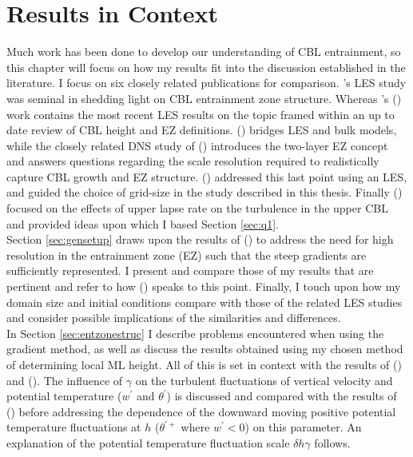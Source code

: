 
\chapter{Results in Context}
\label{ch:disc}
\setlength{\parindent}{0cm}

Much work has been done to develop our understanding of \acs{CBL} entrainment, so this chapter will focus on how my results fit into the discussion established in the literature.  I focus on six closely related publications for comparison.  \citeauthor{SullMoengStev}'s \citeyear{SullMoengStev} \acs{LES} study was seminal in shedding light on \acs{CBL} entrainment zone structure.  Whereas \citeauthor{BrooksFowler2}'s (\citeyear{BrooksFowler2}) work contains the most recent \acs{LES} results on the topic framed within an up to date review of \acs{CBL} height and \acs{EZ} definitions.  \citeauthor{FedConzMir04} (\citeyear{FedConzMir04}) bridges \acs{LES} and bulk models, while the closely related \acs{DNS} study of \citeauthor{GarciaMellado} (\citeyear{GarciaMellado}) introduces the two-layer \acs{EZ} concept and answers questions regarding the scale resolution required to realistically capture \acs{CBL} growth and \acs{EZ} structure.  \citeauthor{SullPat} (\citeyear{SullPat}) addressed this last point using an \acs{LES}, and guided the choice of grid-size in the study described in this thesis.  Finally \citeauthor{Sorbjan1} (\citeyear{Sorbjan1}) focused on the effects of upper lapse rate on the turbulence in the upper \acs{CBL} and provided ideas upon which I based Section \ref{sec:q1}.\\

Section \ref{sec:gensetup} draws upon the results of \citeauthor{SullPat} (\citeyear{SullPat}) to address the need for high resolution in the entrainment zone (\acs{EZ}) such that the steep gradients are sufficiently represented. I present and compare those of my results that are pertinent and refer to how \citeauthor{GarciaMellado} (\citeyear{GarciaMellado}) speaks to this point.  Finally, I touch upon how my domain size and initial conditions compare with those of the related \acs{LES} studies and consider possible implications of the similarities and differences.\\

In Section \ref{sec:entzonestruc} I describe problems encountered when using the gradient method, as well as discuss the results obtained using my chosen method of determining local \acs{ML} height.  All of this is set in context with the results of \citeauthor{SullMoengStev} (\citeyear{SullMoengStev}) and \citeauthor{BrooksFowler2} (\citeyear{BrooksFowler2}).  The influence of $\gamma$ on the turbulent fluctuations of vertical velocity and potential temperature ($w^{'}$ and $\theta^{'}$) is discussed and compared with the results of \citeauthor{Sorbjan1} (\citeyear{Sorbjan1}) before addressing the dependence of the downward moving positive potential temperature fluctuations at $h$ ($\theta^{'+}$ where $w^{'}<0$) on this parameter.  An explanation of the potential temperature fluctuation scale $\delta h \gamma$ follows.\\ 

